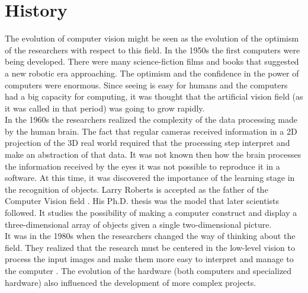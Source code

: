 \section{History}

The evolution of computer vision might be seen as the evolution of the optimism of the researchers with respect to this field. 
In the 1950s the first computers were being developed. There were many science-fiction films and books that suggested a new robotic era approaching. The optimism and the confidence in the power of computers were enormous. 
Since seeing is easy for humans and the computers had a big capacity for computing, it was thought that the artificial vision field (as it was called in that period) was going to grow rapidly. 
\\

In the 1960s the researchers %
realized the complexity of the data processing made by the human brain.
The fact that regular cameras received information in a 2D projection of the 3D real world required that the processing step interpret and make an abstraction of that data.
It was not known then how the brain processes the information received by the eyes it was not possible to reproduce it in a software. 
At this time, it was discovered the importance of the learning stage in the recognition of objects. 
Larry Roberts is accepted as the father of the Computer Vision field \cite{Huang}.
His Ph.D. thesis %
\cite{Roberts1963} was the model that later scientists followed. %
It studies the possibility of making a computer construct and display a three-dimensional array of objects given a single two-dimensional picture. 
\\

 It was in the 1980s when the researchers changed the way of thinking about the field.
They realized that the research must be centered in the low-level vision to process the input images and make them more easy to interpret and manage to the computer \cite{Huang}. 
The evolution of the hardware (both computers and specialized hardware) also influenced the development of more complex projects. 
\\

